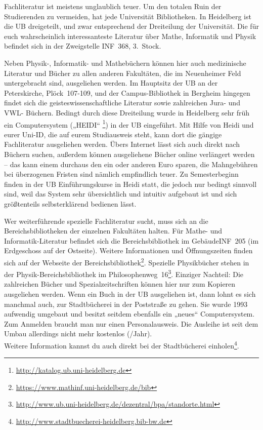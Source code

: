 Fachliteratur ist meistens unglaublich teuer. Um den totalen Ruin der Studierenden zu vermeiden, hat jede Universität Bibliotheken. In Heidelberg ist die \gls{UB} dreigeteilt, und zwar entsprechend der Dreiteilung der Universität. Die für euch wahrscheinlich interessanteste Literatur über Mathe, Informatik und Physik befindet sich in der Zweigstelle \gls{INF}~368, 3.~Stock.

Neben Physik-, Informatik- und Mathebüchern können hier auch medizinische Literatur und Bücher zu allen anderen Fakultäten, die im Neuenheimer Feld untergebracht sind, ausgeliehen werden. Im Hauptsitz der \gls{UB} an der Peterskirche, Plöck~107-109, und der Campus-Bibliothek in Bergheim hingegen findet sich die geisteswissenschaftliche Literatur sowie zahlreichen Jura- und VWL- Büchern. Bedingt durch diese Dreiteilung wurde in Heidelberg sehr früh ein Computersystem („\gls{HEIDI}“ \footnote{\url{http://katalog.ub.uni-heidelberg.de}}) in der UB eingeführt. Mit Hilfe von Heidi und eurer Uni-ID, die auf eurem Studiausweis steht, kann dort die gängige Fachliteratur ausgeliehen werden. Übers Internet lässt sich auch direkt nach Büchern suchen, außerdem können ausgeliehene Bücher online verlängert werden -- das kann einem durchaus den ein oder anderen Euro sparen, die Mahngebühren bei überzogenen Fristen sind nämlich empfindlich teuer. Zu Semesterbeginn finden in der UB Einführungskurse in Heidi statt, die jedoch nur bedingt sinnvoll sind, weil das System sehr übersichtlich und intuitiv aufgebaut ist und sich größtenteils selbsterklärend bedienen lässt.

Wer weiterführende spezielle Fachliteratur sucht, muss sich an die Bereichsbibliotheken der einzelnen Fakultäten halten. Für Mathe- und Informatik-Literatur befindet sich die Bereichsbibliothek im Gebäude\-\gls{INF}~205 (im Erdgeschoss auf der Ostseite). Weitere Informationen und Öffnungszeiten finden sich auf der Webseite der Bereichsbibliothek\footnote{\url{https://www.mathinf.uni-heidelberg.de/bib}}. Spezielle Physikbücher stehen in der Physik-Bereichsbibliothek im Philosophenweg~16\footnote{\url{http://www.ub.uni-heidelberg.de/dezentral/bpa/standorte.html}}. Einziger Nachteil: Die zahlreichen Bücher und Spezialzeitschriften können hier nur zum Kopieren ausgeliehen werden. Wenn ein Buch in der UB ausgeliehen ist, dann lohnt es sich manchmal auch, zur Stadtbücherei in der Poststraße zu gehen. Sie wurde 1993 aufwendig umgebaut und besitzt seitdem ebenfalls ein „neues“ Computersystem. Zum Anmelden braucht man nur einen Personalausweis. Die Ausleihe ist seit dem Umbau allerdings nicht mehr kostenlos (/Jahr).\\ Weitere Information kannst du auch direkt bei der Stadtbücherei einholen\footnote{\url{http://www.stadtbuecherei-heidelberg.bib-bw.de}}.


